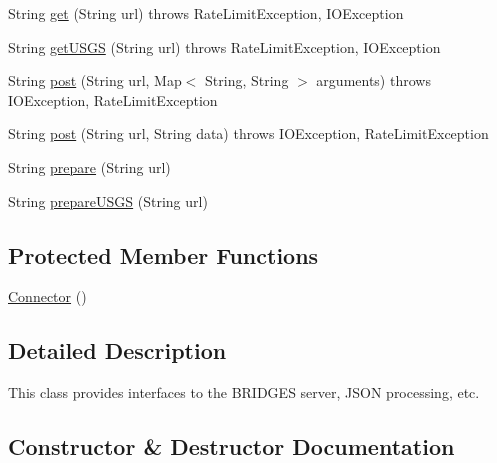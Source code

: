 \begin{DoxyCompactItemize}
\item 
String \mbox{\hyperlink{classbridges_1_1connect_1_1_connector_aec8d54bf707c50d6f8173a0c1640fcd5}{get}} (String url)  throws Rate\+Limit\+Exception, I\+O\+Exception 
\item 
String \mbox{\hyperlink{classbridges_1_1connect_1_1_connector_a1781405c9b38c338bce042bf7ff23eaf}{get\+U\+S\+GS}} (String url)  throws Rate\+Limit\+Exception, I\+O\+Exception 
\item 
String \mbox{\hyperlink{classbridges_1_1connect_1_1_connector_a88e465aed707d59b96958dcc946ff6b4}{post}} (String url, Map$<$ String, String $>$ arguments)  throws I\+O\+Exception, Rate\+Limit\+Exception 
\item 
String \mbox{\hyperlink{classbridges_1_1connect_1_1_connector_a4b8978743a8c230b86500f5a00cb2697}{post}} (String url, String data)  throws I\+O\+Exception, 		\+Rate\+Limit\+Exception 
\item 
String \mbox{\hyperlink{classbridges_1_1connect_1_1_connector_a507ee5a9d8c812ffd4629cbd22f27373}{prepare}} (String url)
\item 
String \mbox{\hyperlink{classbridges_1_1connect_1_1_connector_aa0201e2569358ff906d3c14d654711e5}{prepare\+U\+S\+GS}} (String url)
\end{DoxyCompactItemize}
\subsection*{Protected Member Functions}
\begin{DoxyCompactItemize}
\item 
\mbox{\hyperlink{classbridges_1_1connect_1_1_connector_a167800699b2d191bd625d9c8c8cd9e6f}{Connector}} ()
\end{DoxyCompactItemize}


\subsection{Detailed Description}
This class provides interfaces to the B\+R\+I\+D\+G\+ES server, J\+S\+ON processing, etc. 

\subsection{Constructor \& Destructor Documentation}
\mbox{\label{classbridges_1_1connect_1_1_connector_a167800699b2d191bd625d9c8c8cd9e6f}} 
